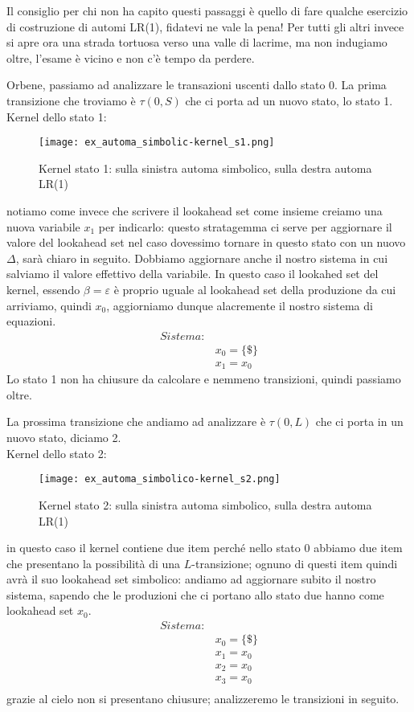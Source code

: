 \documentclass[class=book, crop=false, oneside, 12pt]{standalone}
\begin{document}
Il consiglio per chi non ha capito questi passaggi è quello di fare qualche esercizio di costruzione di automi LR(1), fidatevi ne vale la pena!
Per tutti gli altri invece si apre ora una strada tortuosa verso una valle di lacrime, ma non indugiamo oltre, l'esame è vicino e non c'è tempo da perdere.

Orbene, passiamo ad analizzare le transazioni uscenti dallo stato 0.
La prima transizione che troviamo è \(\tau(0,S)\) che ci porta ad un nuovo stato, lo stato 1.
\\
Kernel dello stato 1:
\begin{figure}[h!]
    \centering
    \texttt{[image: ex\_automa\_simbolic-kernel\_s1.png]}
    \caption{Kernel stato 1: sulla sinistra automa simbolico, sulla destra automa LR(1)}
\end{figure}
notiamo come invece che scrivere il lookahead set come insieme creiamo una nuova variabile \(x_1\) per indicarlo: questo stratagemma ci serve per aggiornare il valore del lookahead set nel caso dovessimo tornare in questo stato con un nuovo \(\Delta\), sarà chiaro in seguito. Dobbiamo aggiornare anche il nostro sistema in cui salviamo il valore effettivo della variabile.
In questo caso il lookahed set del kernel, essendo \(\beta = \varepsilon\) è proprio uguale al lookahead set della produzione da cui arriviamo, quindi \(x_0\), aggiorniamo dunque alacremente il nostro sistema di equazioni.
\begin{align*}
    Sistema:& \\
            & x_0 = \{\$\} \\
            & x_1 = x_0
\end{align*}
Lo stato 1 non ha chiusure da calcolare e nemmeno transizioni, quindi passiamo oltre.

La prossima transizione che andiamo ad analizzare è \(\tau(0,L)\) che ci porta in un nuovo stato, diciamo 2.
\\
Kernel dello stato 2:
\begin{figure}[h!]
    \centering
    \texttt{[image: ex\_automa\_simbolico-kernel\_s2.png]}
    \caption{Kernel stato 2: sulla sinistra automa simbolico, sulla destra automa LR(1)}
\end{figure}
in questo caso il kernel contiene due item perché nello stato 0 abbiamo due item che presentano la possibilità di una \(L\)-transizione; ognuno di questi item quindi avrà il suo lookahead set simbolico: andiamo ad aggiornare subito il nostro sistema, sapendo che le produzioni che ci portano allo stato due hanno come lookahead set \(x_0\).
\begin{align*}
    Sistema:& \\
            & x_0 = \{\$\} \\
            & x_1 = x_0 \\
            & x_2 = x_0 \\
            & x_3 = x_0 \\
\end{align*}
grazie al cielo non si presentano chiusure; analizzeremo le transizioni in seguito.
\end{document}
